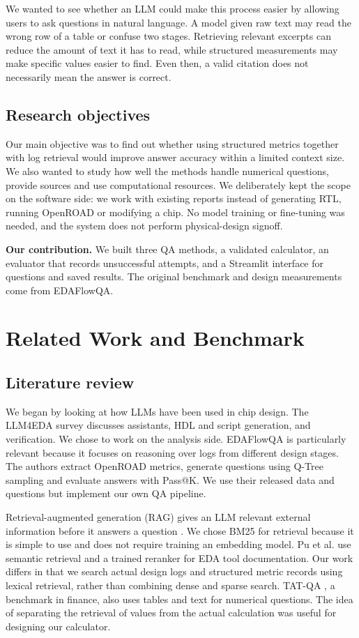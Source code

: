 \documentclass[11pt,a4paper]{article}
\begin{document}
We wanted to see whether an LLM could make this process easier by allowing users to ask questions in natural language. A model given raw text may read the wrong row of a table or confuse two stages. Retrieving relevant excerpts can reduce the amount of text it has to read, while structured measurements may make specific values easier to find. Even then, a valid citation does not necessarily mean the answer is correct.

\subsection{Research objectives}
Our main objective was to find out whether using structured metrics together with log retrieval would improve answer accuracy within a limited context size. We also wanted to study how well the methods handle numerical questions, provide sources and use computational resources. We deliberately kept the scope on the software side: we work with existing reports instead of generating RTL, running OpenROAD or modifying a chip. No model training or fine-tuning was needed, and the system does not perform physical-design signoff.

\textbf{Our contribution.} We built three QA methods, a validated calculator, an evaluator that records unsuccessful attempts, and a Streamlit interface for questions and saved results. The original benchmark and design measurements come from EDAFlowQA.
\newpage
\section{Related Work and Benchmark}
\subsection{Literature review}
We began by looking at how LLMs have been used in chip design. The LLM4EDA survey \cite{llm4eda} discusses assistants, HDL and script generation, and verification. We chose to work on the analysis side. EDAFlowQA \cite{edaflowqa,edadata} is particularly relevant because it focuses on reasoning over logs from different design stages. The authors extract OpenROAD metrics, generate questions using Q-Tree sampling and evaluate answers with Pass@K. We use their released data and questions but implement our own QA pipeline.

Retrieval-augmented generation (RAG) gives an LLM relevant external information before it answers a question \cite{lewis}. We chose BM25 \cite{bm25} for retrieval because it is simple to use and does not require training an embedding model. Pu et al. \cite{rageda} use semantic retrieval and a trained reranker for EDA tool documentation. Our work differs in that we search actual design logs and structured metric records using lexical retrieval, rather than combining dense and sparse search. TAT-QA \cite{tatqa}, a benchmark in finance, also uses tables and text for numerical questions. The idea of separating the retrieval of values from the actual calculation was useful for designing our calculator.
\end{document}
